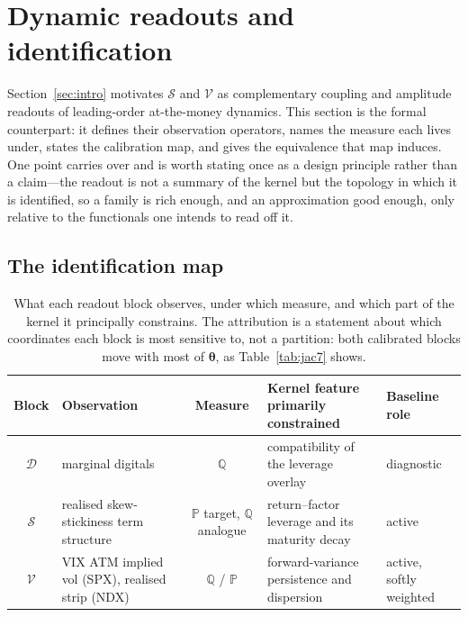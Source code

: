 \documentclass[11pt]{article}
\providecommand{\Prob}{\mathbb{P}}
\providecommand{\Qmeas}{\mathbb{Q}}
\providecommand{\1}{\mathbf 1}
\newcommand{\bth}{{\boldsymbol{\theta}}}
\begin{document}
\section{Dynamic readouts and identification}
\label{sec:identification}

Section~\ref{sec:intro} motivates $\mathcal S$ and $\mathcal V$ as complementary coupling and
amplitude readouts of leading-order at-the-money dynamics. This section is the formal counterpart:
it defines their observation operators, names the measure each lives under, states the calibration
map, and gives the equivalence that map induces. One point carries over and is worth stating once
as a design principle rather than a claim---the readout is not a summary of the kernel but the
topology in which it is identified, so a family is rich enough, and an approximation good enough,
only relative to the functionals one intends to read off it.

\subsection{The identification map}

\begin{table}[htbp]
\centering\small
\begin{tabular}{c p{} c p{} p{}}
\toprule
Block & Observation & Measure & Kernel feature primarily constrained & Baseline role \\
\midrule
$\mathcal D$ & marginal digitals & $\Qmeas$ & compatibility of the leverage overlay & diagnostic \\[2pt]
$\mathcal S$ & realised skew-stickiness term structure & $\Prob$ target,
$\Qmeas$ analogue & return--factor leverage and its maturity decay & active \\[2pt]
$\mathcal V$ & VIX ATM implied vol (SPX), realised strip (NDX) & $\Qmeas$ / $\Prob$ &
forward-variance persistence and dispersion & active, softly weighted \\
\bottomrule
\end{tabular}
\caption{What each readout block observes, under which measure, and which part of the kernel it
principally constrains. The attribution is a statement about which coordinates each block is most
sensitive to, not a partition: both calibrated blocks move with most of $\bth$, as
Table~\ref{tab:jac7} shows.}
\label{tab:readouts}
\end{table}
\end{document}
